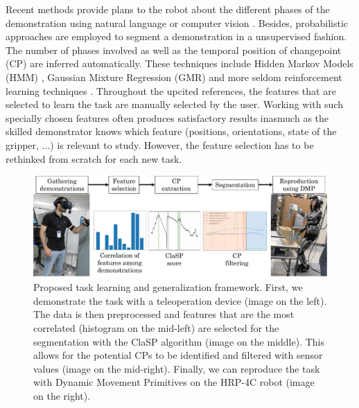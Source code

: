 \documentclass[conference]{IEEEtran}
\begin{document}
Recent methods provide plans to the robot about the different phases of the demonstration using natural language or computer vision \cite{caccavale_kinesthetic_2019} \cite{saran_enhancing_2019}. Besides, probabilistic approaches are employed to segment a demonstration in a unsupervised fashion. The number of phases involved as well as the temporal position of changepoint (CP) are inferred automatically. These techniques include Hidden Markov Models (HMM) \cite{niekum_learning_2015}, Gaussian Mixture Regression (GMR) \cite{calinon_learning_2010} \cite{calinon_learning_2007} and more seldom reinforcement learning techniques \cite{kroemer_towards_2015}. Throughout the upcited references, the features that are selected to learn the task are manually selected by the user. Working with such specially chosen features often produces satisfactory results inasmuch as the skilled demonstrator knows which feature (positions, orientations, state of the gripper, ...) is relevant to study. However, the feature selection has to be rethinked from scratch for each new task. \newline

\begin{figure}[t]
  \centering
  \includegraphics[width=0.85\linewidth]{img/framework.pdf}
  \caption{Proposed task learning and generalization framework. First, we demonstrate the task with a teleoperation device (image on the left). The data is then preprocessed and features that are the most correlated (histogram on the mid-left) are selected for the segmentation with the ClaSP algorithm (image on the middle). This allows for the potential CPs to be identified and filtered with sensor values (image on the mid-right). Finally, we can reproduce the task with Dynamic Movement Primitives on the HRP-4C robot (image on the right).}
  \label{fig:framework}
\end{figure}

\end{document}

